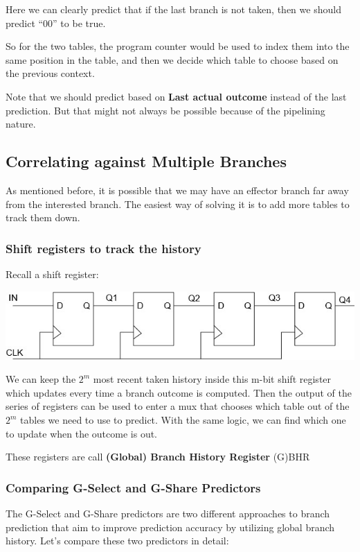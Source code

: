 \documentclass[letterpaper,12pt]{article}
\begin{document}
Here we can clearly predict that if the last branch is not taken, then we should predict ``00'' to be true.

So for the two tables, the program counter would be used to index them into the same position in the table, and then we decide which table to choose based on the previous context.

Note that we should predict based on \textbf{Last actual outcome} instead of the last prediction. But that might not always be possible because of the pipelining nature.

\subsection{Correlating against Multiple Branches}

As mentioned before, it is possible that we may have an effector branch far away from the interested branch. The easiest way of solving it is to add more tables to track them down.

\subsubsection{Shift registers to track the history}
Recall a shift register:

\includegraphics*[scale = 0.7]{./Image/Shift Register.jpg}

We can keep the $2^m$ most recent taken history inside this m-bit shift register which updates every time a branch outcome is computed. Then the output of the series of registers can be used to enter a mux that chooses which table out of the $2^m$ tables we need to use to predict. With the same logic, we can find which one to update when the outcome is out.

These registers are call \textbf{(Global) Branch History Register} (G)BHR
\subsubsection{Comparing G-Select and G-Share Predictors}

The G-Select and G-Share predictors are two different approaches to branch prediction that aim to improve prediction accuracy by utilizing global branch history. Let's compare these two predictors in detail:
\end{document}
